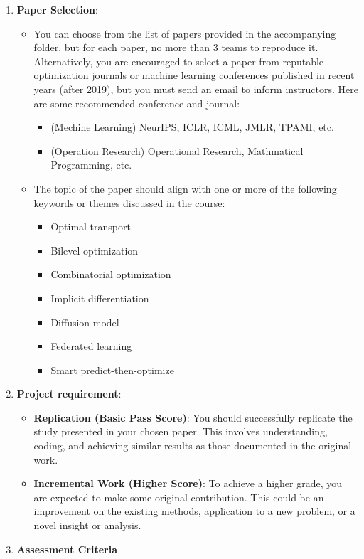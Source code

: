 \documentclass[a4paper, 11pt]{article}
\begin{document}
\begin{enumerate}[label=\arabic*.]
	\item \textbf{Paper Selection}:
	\begin{itemize}
		\item You can choose from the list of papers provided in the accompanying folder, but for each paper, no more than 3 teams to reproduce it. Alternatively, you are encouraged to select a paper from reputable optimization journals or machine learning conferences published in recent years (after 2019), but you must send an email to inform instructors. Here are some recommended conference and journal:
		\begin{itemize}
			\item (Mechine Learning) NeurIPS, ICLR, ICML, JMLR, TPAMI, etc.
			\item (Operation Research) Operational Research, Mathmatical Programming, etc.
		\end{itemize}
		\item The topic of the paper should align with one or more of the following keywords or themes discussed in the course:
		\begin{itemize}
			\item Optimal transport
			\item Bilevel optimization
			\item Combinatorial optimization
			\item Implicit differentiation
			\item Diffusion model
			\item Federated learning
			\item Smart predict-then-optimize
		\end{itemize}
	\end{itemize}
	
	\item \textbf{Project requirement}:
	\begin{itemize}
		\item \textbf{Replication (Basic Pass Score)}: You should successfully replicate the study presented in your chosen paper. This involves understanding, coding, and achieving similar results as those documented in the original work.
		\item \textbf{Incremental Work (Higher Score)}: To achieve a higher grade, you are expected to make some original contribution. This could be an improvement on the existing methods, application to a new problem, or a novel insight or analysis.
	\end{itemize}
	\item \textbf{Assessment Criteria}
	

\end{enumerate}
\end{document}

